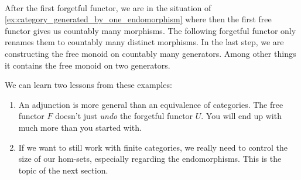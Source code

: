 \begin{example}
\[\begin{minipage}{.25\textwidth}
\begin{tikzcd}
\end{tikzcd}
\end{minipage}
\begin{minipage}{.10\textwidth}
\phantom{}
\end{minipage}
\]
After the first forgetful functor, we are in the situation of \ref{ex:category_generated_by_one_endomorphism} where then the first free functor
gives us countably many morphisms.
The following forgetful functor only renames them to countably many distinct morphisms.
In the last step, we are constructing the free monoid on countably many generators. Among other things it contains the free monoid on two
generators.
\end{example}

We can learn two lessons from these examples:
\begin{enumerate}
\item An adjunction is more general than an equivalence of categories. The free functor $F$ doesn't just \textit{undo} the forgetful functor $U$.
You will end up with much more than you started with.
\item If we want to still work with finite categories, we really need to control the size of our hom-sets, especially regarding the endomorphisms.
This is the topic of the next section.
\end{enumerate}

\vspace{4em}

